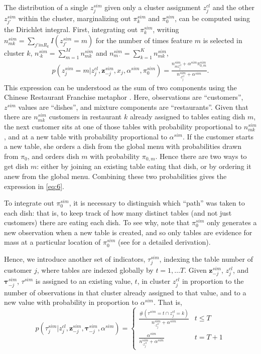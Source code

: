 \documentclass[12pt]{article}
\begin{document}
The distribution of a single $z^{sim}_j$ given only a cluster assignment $z^{cl}_j$ and the other $z^{sim}_{j'}$ within the cluster, marginalizing out $\pi^{sim}_k$ and $\pi^{sim}_0$, can be computed using the Dirichlet integral.  First, integrating out $\pi^{sim}_k$, writing $n^{sim}_{mk} = \sum_{j' in R_k} I(z^{sim}_{j'} = m)$ for the number of times feature $m$ is selected in cluster $k$, $n^{sim}_{\cdot k} = \sum_{m=1}^M n^{sim}_{mk}$ and $n^{sim}_{m\cdot} = \sum_{k=1}^K n^{sim}_{mk}$,
\begin{align}
  \label{eq:6}
  p(z^{sim}_{j}  = m \vert z^{cl}_{j}, \mathbf{z}^{sim}_{-j}, x_{j}, \alpha^{sim}, \pi^{sim}_0) = \frac{n^{sim}_{mz^{cl}_j} + \alpha^{sim} \pi^{sim}_{0,m}}{n^{sim}_{\cdot z^{cl}_j} + \alpha^{sim}}.
\end{align}
This expression can be understood as the sum of two components using the Chinese Restaurant Franchise metaphor \cite{teh2006hierarchical}.  Here, observations are ``customers'', $z^{sim}$ values are ``dishes'', and mixture components are ``restaurants''.  Given that there are $n^{sim}_{mk}$ customers in restaurant $k$ already assigned to tables eating dish $m$, the next customer sits at one of those tables with probability proportional to $n^{sim}_{mk}$, and at a new table with probability proportional to $\alpha^{sim}$.  If the customer starts a new table, she orders a dish from the global menu with probabilities drawn from $\pi_0$, and orders dish $m$ with probability $\pi_{0,m}$.  Hence there are two ways to get dish $m$: either by joining an existing table eating that dish, or by ordering it anew from the global menu.  Combining these two probabilities gives the expression in \ref{eq:6}.

To integrate out $\pi^{sim}_0$, it is necessary to distinguish which ``path'' was taken to each dish: that is, to keep track of how many distinct tables (and not just customers) there are eating each dish.  To see why, note that $\pi^{sim}_0$ only generates a new observation when a new table is created, and so only tables are evidence for mass at a particular location of $\pi^{sim}_0$ (see \cite{wallach2009rethinking} for a detailed derivation).

Hence, we introduce another set of indicators, $\tau^{sim}_j$, indexing the table number of customer $j$, where tables are indexed globally by $t = 1, \dots T$.  Given $\mathbf{z}^{sim}_{-j}$, $z^{cl}_j$, and $\boldsymbol{\tau}^{sim}_{-j}$, $\tau^{sim}$ is assigned to an existing value, $t$, in cluster $z^{cl}_j$ in proportion to the number of observations in that cluster already assigned to that value, and to a new value with probability in proportion to $\alpha^{sim}$.  That is,
\begin{equation}
  \label{eq:7}
  p(\tau^{sim}_j \vert z^{cl}_{j}, \mathbf{z}^{sim}_{-j}, \boldsymbol{\tau}^{sim}_{-j}, \alpha^{sim}) = 
  \begin{cases}
    \frac{\#(\tau^{sim} = t \cap z^{cl}_j = k)}{n^{sim}_{\cdot z^{cl}_j} + \alpha^{sim}} & t \leq T \\
    \frac{\alpha^{sim}}{n^{sim}_{\cdot z^{cl}_j} + \alpha^{sim}} & t = T+1
  \end{cases}
\end{equation}
\end{document}
